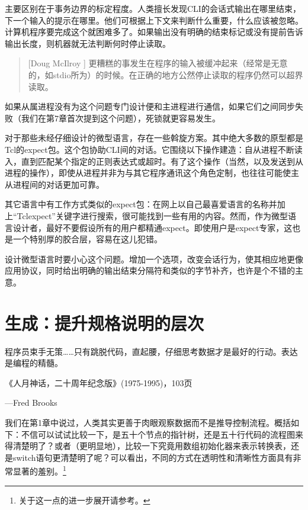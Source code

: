 \documentclass[12pt,oneside]{book}
\begin{document}
\begin{common-format}
主要区别在于事务边界的标定程度。人类擅长发现CLI的会话式输出在哪里结束，下一个输入的提示在哪里。他们可根据上下文来判断什么重要，什么应该被忽略。计算机程序要完成这个就困难多了。如果输出没有明确的结束标记或没有提前告诉输出长度，则机器就无法判断何时停止读取。

\begin{quote}[Doug McIlroy 	]
更糟糕的事发生在程序的输入被缓冲起来（经常是无意的，如stdio所为）的时候。在正确的地方公然停止读取的程序仍然可以超界读取。
\end{quote}

如果从属进程没有为这个问题专门设计便和主进程进行通信，如果它们之间同步失败（我们在第7章首次提到这个问题），死锁就更容易发生。

对于那些未经仔细设计的微型语言，存在一些斡旋方案。其中绝大多数的原型都是Tcl的expect包。这个包协助CLI间的对话。它围绕以下操作建造：自从进程不断读入，直到匹配某个指定的正则表达式或超时。有了这个操作（当然，以及发送到从进程的操作），即使从进程并非为与其它程序通讯这个角色定制，也往往可能使主从进程间的对话更加可靠。

其它语言中有工作方式类似的expect包：在网上以自己最喜爱语言的名称并加上“Tclexpect”关键字进行搜索，很可能找到一些有用的内容。然而，作为微型语言设计者，最好不要假设所有的用户都精通expect。即使用户是expect专家，这也是一个特别厚的胶合层，容易在这儿犯错。

设计微型语言时要小心这个问题。增加一个选项，改变会话行为，使其相应地更像应用协议，同时给出明确的输出结束分隔符和类似的字节补齐，也许是个不错的主意。



\chapter{生成：提升规格说明的层次}
\begin{flushright}
\begin{notecard}{30em}
程序员束手无策……只有跳脱代码，直起腰，仔细思考数据才是最好的行动。表达是编程的精髓。

《人月神话，二十周年纪念版》(1975-1995)，103页

{\hfill —Fred Brooks}
\end{notecard}
\end{flushright}

我们在第1章中说过，人类其实更善于肉眼观察数据而不是推导控制流程。概括如下：不信可以试试比较一下，是五十个节点的指针树，还是五十行代码的流程图来得清楚明了？或者（更明显地），比较一下究竟用数组初始化器来表示转换表，还是switch语句更清楚明了呢？可以看出，不同的方式在透明性和清晰性方面具有非常显著的羞别。\footnote{关于这一点的进一步展开请参考\cite{Bentley}。}


\end{common-format}
\end{document}
